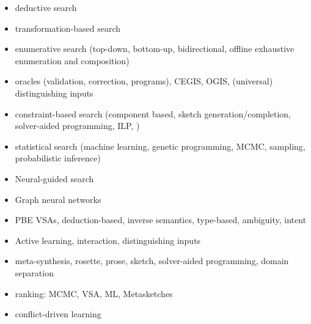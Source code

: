 \begin{itemize}
\item deductive search
\item transformation-based search
\item enumerative search (top-down, bottom-up, bidirectional, offline exhaustive enumeration and composition)
\item oracles (validation, correction, programs), CEGIS, OGIS, (universal) distinguishing inputs
\item constraint-based search (component based, sketch generation/completion, solver-aided programming, ILP, )
\item statistical search (machine learning, genetic programming, MCMC, sampling, probabilistic inference)
\item Neural-guided search
\item Graph neural networks
\item PBE VSAs, deduction-based, inverse semantics, type-based, ambiguity, intent
\item Active learning, interaction, distinguishing inputs
\item meta-synthesis, rosette, prose, sketch, solver-aided programming, domain separation
\item ranking: MCMC, VSA, ML, Metasketches
\item conflict-driven learning
\end{itemize}


